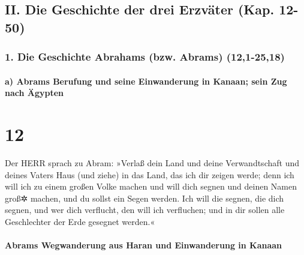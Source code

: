 \hypertarget{ii.-die-geschichte-der-drei-erzvuxe4ter-kap.-12-50}{%
\subsection{II. Die Geschichte der drei Erzväter (Kap.
12-50)}\label{ii.-die-geschichte-der-drei-erzvuxe4ter-kap.-12-50}}

\hypertarget{die-geschichte-abrahams-bzw.-abrams-121-2518}{%
\subsubsection{1. Die Geschichte Abrahams (bzw. Abrams)
(12,1-25,18)}\label{die-geschichte-abrahams-bzw.-abrams-121-2518}}

\hypertarget{a-abrams-berufung-und-seine-einwanderung-in-kanaan-sein-zug-nach-uxe4gypten}{%
\paragraph{a) Abrams Berufung und seine Einwanderung in Kanaan; sein Zug
nach
Ägypten}\label{a-abrams-berufung-und-seine-einwanderung-in-kanaan-sein-zug-nach-uxe4gypten}}

\hypertarget{section-11}{%
\section{12}\label{section-11}}

 Der HERR sprach zu Abram: »Verlaß dein Land und deine
Verwandtschaft und deines Vaters Haus (und ziehe) in das Land, das ich
dir zeigen werde;  denn ich will ich zu einem großen Volke
machen und will dich segnen und deinen Namen groß✲ machen, und du sollst
ein Segen werden.  Ich will die segnen, die dich segnen,
und wer dich verflucht, den will ich verfluchen; und in dir sollen alle
Geschlechter der Erde gesegnet werden.«

\hypertarget{abrams-wegwanderung-aus-haran-und-einwanderung-in-kanaan}{%
\paragraph{Abrams Wegwanderung aus Haran und Einwanderung in
Kanaan}\label{abrams-wegwanderung-aus-haran-und-einwanderung-in-kanaan}}

